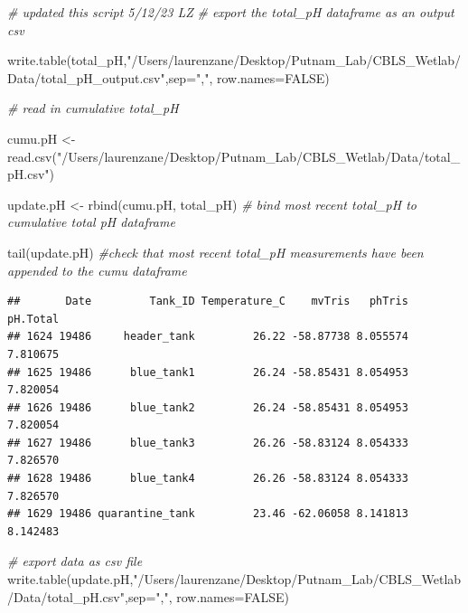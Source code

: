 \documentclass[
]{article}
\newenvironment{Shaded}{\begin{snugshade}}{\end{snugshade}}
\newcommand{\AttributeTok}[1]{\textcolor[rgb]{0.77,0.63,0.00}{#1}}
\newcommand{\CommentTok}[1]{\textcolor[rgb]{0.56,0.35,0.01}{\textit{#1}}}
\newcommand{\ConstantTok}[1]{\textcolor[rgb]{0.00,0.00,0.00}{#1}}
\newcommand{\FunctionTok}[1]{\textcolor[rgb]{0.00,0.00,0.00}{#1}}
\newcommand{\NormalTok}[1]{#1}
\newcommand{\OtherTok}[1]{\textcolor[rgb]{0.56,0.35,0.01}{#1}}
\newcommand{\StringTok}[1]{\textcolor[rgb]{0.31,0.60,0.02}{#1}}
\begin{document}
\begin{Shaded}
\begin{Highlighting}[]
\CommentTok{\# updated this script 5/12/23 LZ}
\CommentTok{\# export the total\_pH dataframe as an output csv}

\FunctionTok{write.table}\NormalTok{(total\_pH,}\StringTok{"/Users/laurenzane/Desktop/Putnam\_Lab/CBLS\_Wetlab/Data/total\_pH\_output.csv"}\NormalTok{,}\AttributeTok{sep=}\StringTok{","}\NormalTok{, }\AttributeTok{row.names=}\ConstantTok{FALSE}\NormalTok{) }

\CommentTok{\# read in cumulative total\_pH }

\NormalTok{cumu.pH }\OtherTok{\textless{}{-}} \FunctionTok{read.csv}\NormalTok{(}\StringTok{"/Users/laurenzane/Desktop/Putnam\_Lab/CBLS\_Wetlab/Data/total\_pH.csv"}\NormalTok{)}

\NormalTok{update.pH }\OtherTok{\textless{}{-}} \FunctionTok{rbind}\NormalTok{(cumu.pH, total\_pH) }\CommentTok{\# bind most recent total\_pH to cumulative total pH dataframe }

\FunctionTok{tail}\NormalTok{(update.pH) }\CommentTok{\#check that most recent total\_pH measurements have been appended to the cumu dataframe}
\end{Highlighting}
\end{Shaded}

\begin{verbatim}
##       Date         Tank_ID Temperature_C    mvTris   phTris pH.Total
## 1624 19486     header_tank         26.22 -58.87738 8.055574 7.810675
## 1625 19486      blue_tank1         26.24 -58.85431 8.054953 7.820054
## 1626 19486      blue_tank2         26.24 -58.85431 8.054953 7.820054
## 1627 19486      blue_tank3         26.26 -58.83124 8.054333 7.826570
## 1628 19486      blue_tank4         26.26 -58.83124 8.054333 7.826570
## 1629 19486 quarantine_tank         23.46 -62.06058 8.141813 8.142483
\end{verbatim}

\begin{Shaded}
\begin{Highlighting}[]
\CommentTok{\# export data as csv file}
\FunctionTok{write.table}\NormalTok{(update.pH,}\StringTok{"/Users/laurenzane/Desktop/Putnam\_Lab/CBLS\_Wetlab/Data/total\_pH.csv"}\NormalTok{,}\AttributeTok{sep=}\StringTok{","}\NormalTok{, }\AttributeTok{row.names=}\ConstantTok{FALSE}\NormalTok{)}
\end{Highlighting}
\end{Shaded}
\end{document}
